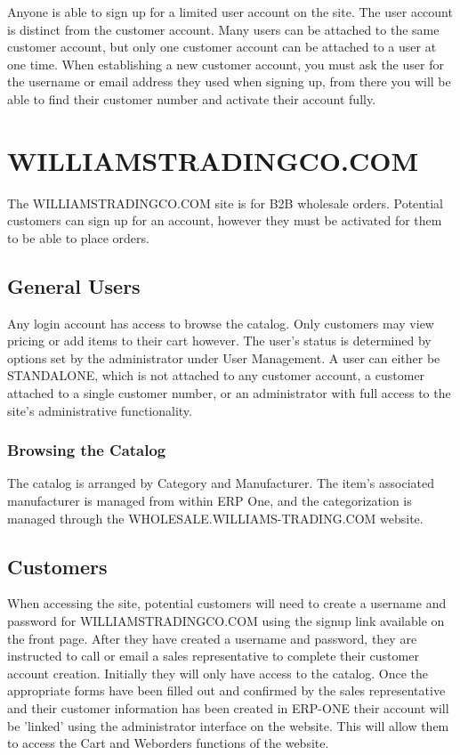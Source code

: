 Anyone is able to sign up for a limited user account on the site.  The user account is distinct from the customer account.  Many users can be attached to the same customer account, but only one customer account can be attached to a user at one time.  When establishing a new customer account, you must ask the user for the username or email address they used when signing up, from there you will be able to find their customer number and activate their account fully.

\section{WILLIAMSTRADINGCO.COM}

The WILLIAMSTRADINGCO.COM site is for B2B wholesale orders.  Potential customers can sign up for an account, however they must be activated for them to be able to place orders.

\subsection{General Users}

Any login account has access to browse the catalog. Only customers may view pricing or add items to their cart however. The user's status is determined by options set by the administrator under User Management. A user can either be STANDALONE, which is not attached to any customer account, a customer attached to a single customer number, or an administrator with full access to the site's administrative functionality.

\subsubsection{Browsing the Catalog}

The catalog is arranged by Category and Manufacturer. The item's associated manufacturer is managed from within ERP One, and the categorization is managed through the WHOLESALE.WILLIAMS-TRADING.COM website.

\subsection{Customers}

When accessing the site, potential customers will need to create a username and password for WILLIAMSTRADINGCO.COM using the signup link available on the front page.  After they have created a username and password, they are instructed to call or email a sales representative to complete their customer account creation.  Initially they will only have access to the catalog.  Once the appropriate forms have been filled out and confirmed by the sales representative and their customer information has been created in ERP-ONE their account will be 'linked' using the administrator interface on the website.  This will allow them to access the Cart and Weborders functions of the website.

